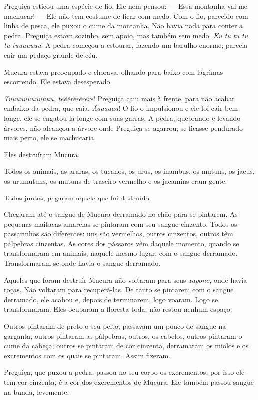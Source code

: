 Preguiça esticou uma espécie de fio. Ele nem pensou: --- Essa montanha vai
me machucar! --- Ele não tem costume de ficar com medo. Com o fio,
parecido com linha de pesca, ele puxou o cume da montanha. Não havia
nada para conter a pedra. Preguiça estava sozinho, sem apoio, mas também
sem medo. \textit{Ku tu tu tu tu tuuuuuuu}! A pedra começou a estourar,
fazendo um barulho enorme; parecia cair um pedaço grande de céu. 

Mucura estava preocupado e chorava, olhando para baixo com lágrimas
escorrendo. Ele estava desesperado. 

\textit{Tuuuuuuuuuuuu, tẽẽẽrërërërë}! Preguiça caiu mais à frente, para
não acabar embaixo da pedra, que caía. \textit{Ãaaaaaa}! O fio o
impulsionou e ele foi cair bem longe, ele se engatou lá longe com suas
garras. A pedra, quebrando e levando árvores, não alcançou a árvore onde
Preguiça se agarrou; se ficasse pendurado mais perto, ele se
machucaria. 

Eles destruíram Mucura. 

Todos os animais, as araras, os tucanos, os urus, os inambus, os mutuns,
os jacus, os urumutuns, os mutuns-de-traseiro-vermelho e os jacamins
eram gente. 

Todos juntos, pegaram aquele que foi destruído. 

Chegaram até o sangue de Mucura derramado no chão para se pintarem. As
pequenas maitacas amarelas se pintaram com seu sangue cinzento. Todos os
passarinhos são diferentes: uns são vermelhos, outros cinzentos, outros
têm pálpebras cinzentas. As cores dos pássaros vêm daquele momento,
quando se transformaram em animais, naquele mesmo lugar, com o sangue
derramado. Transformaram-se onde havia o sangue derramado. 

Aqueles que foram destruir Mucura não voltaram para seus \textit{xapono}, onde
havia roças. Não voltaram para recuperá-las. De tanto se pintarem com o
sangue derramado, ele acabou e, depois de terminarem, logo voaram. Logo
se transformaram. Eles ocuparam a floresta toda, não restou nenhum
espaço. 

Outros pintaram de preto o seu peito, passavam um pouco de sangue na
garganta, outros pintaram as pálpebras, outros, os cabelos, outros
pintaram o cume da cabeça; outros se pintaram de cor cinzenta,
derramaram os miolos e os excrementos com os quais se pintaram. Assim
fizeram. 

Preguiça, que puxou a pedra, passou no seu corpo os excrementos, por
isso ele tem cor cinzenta, é a cor dos excrementos de Mucura. Ele também
passou sangue na bunda, levemente. 

